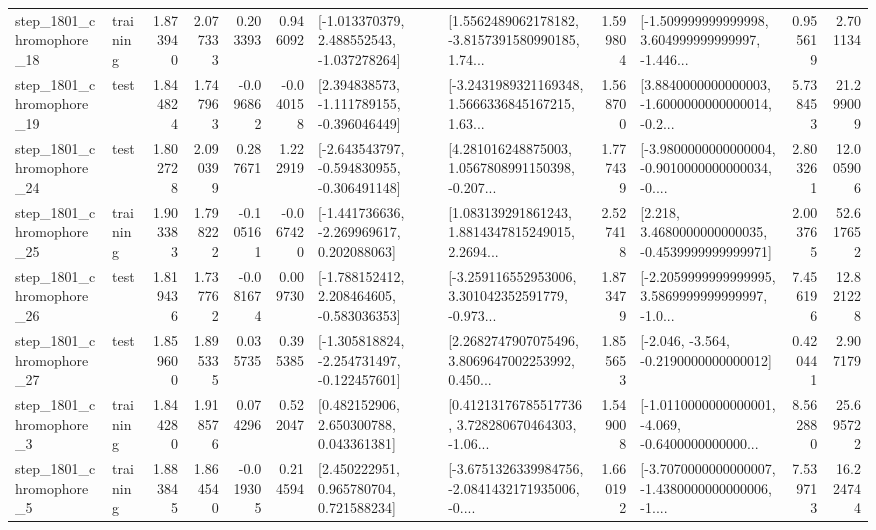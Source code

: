 \begin{tabular}{llrrrrllrlrr}
 step\_1801\_chromophore\_18 &  training &      1.873940 &    2.077333 &      0.203393 &  0.946092 &   [-1.013370379, 2.488552543, -1.037278264] &  [1.5562489062178182, -3.8157391580990185, 1.74... &       1.599804 &  [-1.509999999999998, 3.604999999999997, -1.446... &            0.955619 &          2.701134 \\
 step\_1801\_chromophore\_19 &      test &      1.844824 &    1.747963 &     -0.096862 & -0.040158 &   [2.394838573, -1.111789155, -0.396046449] &  [-3.2431989321169348, 1.5666336845167215, 1.63... &       1.568700 &  [3.8840000000000003, -1.6000000000000014, -0.2... &            5.738453 &         21.299009 \\
 step\_1801\_chromophore\_24 &      test &      1.802728 &    2.090399 &      0.287671 &  1.222919 &  [-2.643543797, -0.594830955, -0.306491148] &  [4.281016248875003, 1.0567808991150398, -0.207... &       1.777439 &  [-3.9800000000000004, -0.9010000000000034, -0.... &            2.803261 &         12.005906 \\
 step\_1801\_chromophore\_25 &  training &      1.903383 &    1.798222 &     -0.105161 & -0.067420 &   [-1.441736636, -2.269969617, 0.202088063] &  [1.083139291861243, 1.8814347815249015, 2.2694... &       2.527418 &   [2.218, 3.4680000000000035, -0.4539999999999971] &            2.003765 &         52.617652 \\
 step\_1801\_chromophore\_26 &      test &      1.819436 &    1.737762 &     -0.081674 &  0.009730 &   [-1.788152412, 2.208464605, -0.583036353] &  [-3.259116552953006, 3.301042352591779, -0.973... &       1.873479 &  [-2.2059999999999995, 3.5869999999999997, -1.0... &            7.456196 &         12.821228 \\
 step\_1801\_chromophore\_27 &      test &      1.859600 &    1.895335 &      0.035735 &  0.395385 &  [-1.305818824, -2.254731497, -0.122457601] &  [2.2682747907075496, 3.8069647002253992, 0.450... &       1.855653 &              [-2.046, -3.564, -0.2190000000000012] &            0.420441 &          2.907179 \\
  step\_1801\_chromophore\_3 &  training &      1.844280 &    1.918576 &      0.074296 &  0.522047 &     [0.482152906, 2.650300788, 0.043361381] &  [0.41213176785517736, 3.728280670464303, -1.06... &       1.549008 &  [-1.0110000000000001, -4.069, -0.6400000000000... &            8.562880 &         25.695722 \\
  step\_1801\_chromophore\_5 &  training &      1.883845 &    1.864540 &     -0.019305 &  0.214594 &     [2.450222951, 0.965780704, 0.721588234] &  [-3.6751326339984756, -2.0841432171935006, -0.... &       1.660192 &  [-3.7070000000000007, -1.4380000000000006, -1.... &            7.539713 &         16.224744 \\

\end{tabular}
